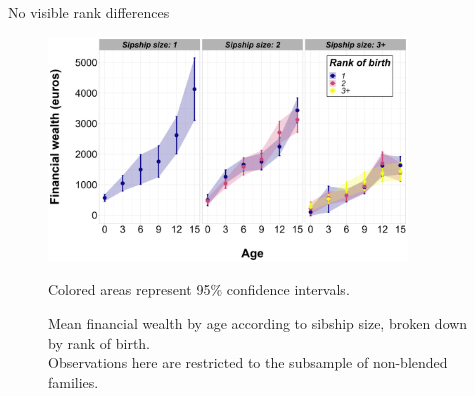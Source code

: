 \documentclass[xolor = dvipsnames, compress]{beamer} %
\begin{document}

\begin{frame}[label = rank_sibhip]{No visible rank differences}    
	\begin{figure}[h]
		\centering
		\includegraphics[width = 0.85\textwidth, height = 0.85\textheight, keepaspectratio]{wealth_age3_rank3_sibsize3_within.png}
		\vspace{-0.3cm}
		\caption*{\tiny{Colored areas represent 95\% confidence intervals.}}
		\vspace{-0.5cm}
		\caption{\scriptsize{Mean financial wealth by age according to sibship size, broken down by rank of birth.
		\\
		Observations here are restricted to the subsample of non-blended families.}}
	\end{figure}
\end{frame}

\end{document}
